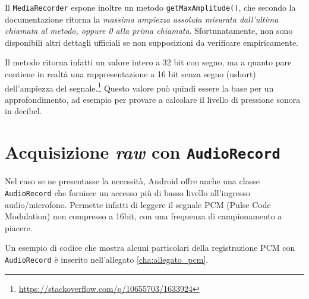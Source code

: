
Il \texttt{MediaRecorder} espone inoltre un metodo \texttt{getMaxAmplitude()}, che secondo la documentazione\footnotemark{} ritorna la \emph{massima ampiezza assoluta misurata dall'ultima chiamata al metodo, oppure 0 alla prima chiamata}. Sfortunatamente, non sono disponibili altri dettagli ufficiali se non supposizioni da verificare empiricamente.


Il metodo ritorna infatti un valore intero a 32 bit con segno, ma a quanto pare contiene in realtà una rappresentazione a 16 bit senza segno (ushort) dell'ampiezza del segnale.\footnote{\url{https://stackoverflow.com/q/10655703/1633924}} Questo valore può quindi essere la base per un approfondimento, ad esempio per provare a calcolare il livello di pressione sonora in decibel.

\section{Acquisizione \emph{raw} con \texttt{AudioRecord}}
\label{sec:audio_audiorecord}

Nel caso se ne presentasse la necessità, Android offre anche una classe \texttt{AudioRecord} che fornisce un accesso più di basso livello all'ingresso audio/microfono. Permette infatti di leggere il segnale PCM (Pulse Code Modulation) non compresso a 16bit, con una frequenza di campionamento a piacere.

Un esempio di codice che mostra alcuni particolari della registrazione PCM con \texttt{AudioRecord} è inserito nell'allegato \ref{cha:allegato_pcm}.

